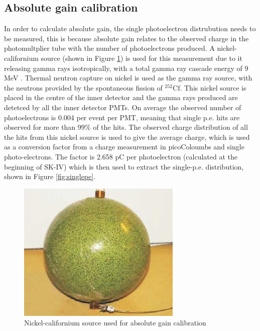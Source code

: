 \subsection{Absolute gain calibration}

In order to calculate absolute gain, the single photoelectron distrubution needs to be measured, this is because absolute gain relates to the observed charge in the photomultplier tube with the number of photoelectrons produced. A nickel-californium source (shown in Figure \ref{fig:nickel_source}) is used for this measurement due to it releasing gamma rays isotropically, with a total gamma ray cascade energy of 9 MeV \cite{koshio1998study}. Thermal neutron capture on nickel is used as the gamma ray source, with the neutrons provided by the spontaneous fission of ${ }^{252} \mathrm{Cf}$. This nickel source is placed in the centre of the inner detector and the gamma rays produced are detetced by all the inner detector PMTs. On average the observed number of photoelectrons is 0.004 per event per PMT, meaning that single p.e. hits are observed for more than 99\% of the hits. The observed charge distribution of all the hits from this nickel source is used to give the average charge, which is used as a conversion factor from a charge measurement in picoColoumbs and single photo-electrons. The factor is 2.658 pC per photoelectron (calculated at the beginning of SK-IV) which is then used to extract the single-p.e. distribution, shown in Figure \ref{fig:singlepe}.

\begin{figure}
    \centering
        \includegraphics[width=.7\textwidth]{Figures/nickel_source.png}
    \caption{Nickel-californium source used for absolute gain calibration \cite{abe_calibration_2014}}
        \label{fig:nickel_source}
\end{figure}

